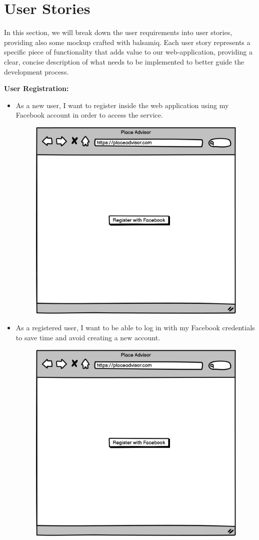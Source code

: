 \documentclass[../main.tex]{subfiles}
\begin{document}
\section{User Stories}\label{sec:userstories}

In this section, we will break down the user requirements into user stories, providing also some mockup crafted with balsamiq. Each user story represents a specific piece of functionality that adds value to our web-application, providing a clear, concise description of what needs to be implemented to better guide the development process. 

\textbf{User Registration:}
\begin{itemize}
  \item As a new user, I want to register inside the web application using my Facebook account in order to access the service.
  \begin{figure}[h]
	\centering
	\label{fig:pngegg}
	\includegraphics[width=0.5\linewidth]{../figures/mockup/US1.png}
  \end{figure}
  \item As a registered user, I want to be able to log in with my Facebook credentials to save time and avoid creating a new account.
  \begin{figure}[H]
	\centering
	\label{fig:pngegg}
	\includegraphics[width=0.5\linewidth]{../figures/mockup/US1.png}
  \end{figure}
  
\end{itemize}
\end{document}
